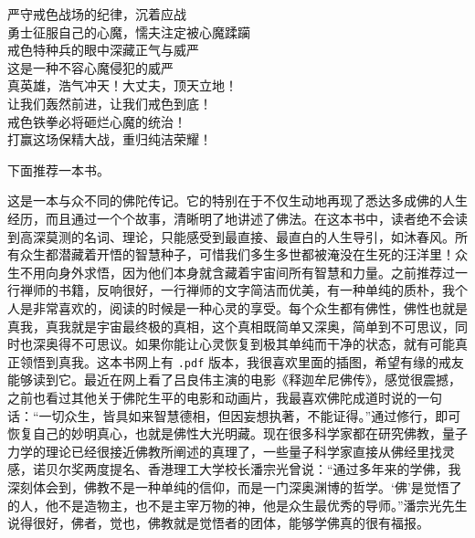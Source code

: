 \begin{adjustwidth}{-2em}{-2em}
\begin{poem}[中国戒色力量]
\begin{multicols}{2}
严守戒色战场的纪律，沉着应战 \\ 勇士征服自己的心魔，懦夫注定被心魔蹂躏 \\ 戒色特种兵的眼中深藏正气与威严 \\ 这是一种不容心魔侵犯的威严 \\ 真英雄，浩气冲天！大丈夫，顶天立地！ \\ 让我们轰然前进，让我们戒色到底！ \\ 戒色铁拳必将砸烂心魔的统治！ \\ 打赢这场保精大战，重归纯洁荣耀！
        \end{multicols}
    \end{poem}
\end{adjustwidth}

下面推荐一本书。

\begin{book}
    这是一本与众不同的佛陀传记。它的特别在于不仅生动地再现了悉达多成佛的人生经历，而且通过一个个故事，清晰明了地讲述了佛法。在这本书中，读者绝不会读到高深莫测的名词、理论，只能感受到最直接、最直白的人生导引，如沐春风。所有众生都潜藏着开悟的智慧种子，可惜我们多生多世都被淹没在生死的汪洋里！众生不用向身外求悟，因为他们本身就含藏着宇宙间所有智慧和力量。之前推荐过一行禅师的书籍，反响很好，一行禅师的文字简洁而优美，有一种单纯的质朴，我个人是非常喜欢的，阅读的时候是一种心灵的享受。每个众生都有佛性，佛性也就是真我，真我就是宇宙最终极的真相，这个真相既简单又深奥，简单到不可思议，同时也深奥得不可思议。如果你能让心灵恢复到极其单纯而干净的状态，就有可能真正领悟到真我。这本书网上有 \texttt{.pdf} 版本，我很喜欢里面的插图，希望有缘的戒友能够读到它。最近在网上看了吕良伟主演的电影《释迦牟尼佛传》，感觉很震撼，之前也看过其他关于佛陀生平的电影和动画片，我最喜欢佛陀成道时说的一句话：“一切众生，皆具如来智慧德相，但因妄想执著，不能证得。”通过修行，即可恢复自己的妙明真心，也就是佛性大光明藏。现在很多科学家都在研究佛教，量子力学的理论已经很接近佛教所阐述的真理了，一些量子科学家直接从佛经里找灵感，诺贝尔奖两度提名、香港理工大学校长潘宗光曾说：“通过多年来的学佛，我深刻体会到，佛教不是一种单纯的信仰，而是一门深奥渊博的哲学。‘佛’是觉悟了的人，他不是造物主，也不是主宰万物的神，他是众生最优秀的导师。”潘宗光先生说得很好，佛者，觉也，佛教就是觉悟者的团体，能够学佛真的很有福报。
\end{book}
